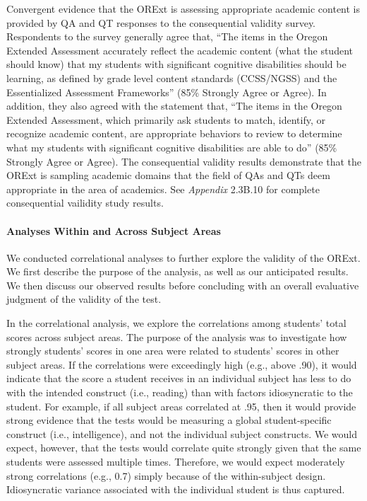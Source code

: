 \documentclass[]{article}
\let\oldparagraph\paragraph
\renewcommand{\paragraph}[1]{\oldparagraph{#1}\mbox{}}
\begin{document}
Convergent evidence that the ORExt is assessing appropriate academic
content is provided by QA and QT responses to the consequential validity
survey. Respondents to the survey generally agree that, ``The items in
the Oregon Extended Assessment accurately reflect the academic content
(what the student should know) that my students with significant
cognitive disabilities should be learning, as defined by grade level
content standards (CCSS/NGSS) and the Essentialized Assessment
Frameworks'' (85\% Strongly Agree or Agree). In addition, they also
agreed with the statement that, ``The items in the Oregon Extended
Assessment, which primarily ask students to match, identify, or
recognize academic content, are appropriate behaviors to review to
determine what my students with significant cognitive disabilities are
able to do'' (85\% Strongly Agree or Agree). The consequential validity
results demonstrate that the ORExt is sampling academic domains that the
field of QAs and QTs deem appropriate in the area of academics. See
\emph{Appendix} 2.3B.10 for complete consequential vailidity study
results.

\paragraph{Analyses Within and Across Subject
Areas}\label{analyses-within-and-across-subject-areas}

We conducted correlational analyses to further explore the validity of
the ORExt. We first describe the purpose of the analysis, as well as our
anticipated results. We then discuss our observed results before
concluding with an overall evaluative judgment of the validity of the
test.

In the correlational analysis, we explore the correlations among
students' total scores across subject areas. The purpose of the analysis
was to investigate how strongly students' scores in one area were
related to students' scores in other subject areas. If the correlations
were exceedingly high (e.g., above .90), it would indicate that the
score a student receives in an individual subject has less to do with
the intended construct (i.e., reading) than with factors idiosyncratic
to the student. For example, if all subject areas correlated at .95,
then it would provide strong evidence that the tests would be measuring
a global student-specific construct (i.e., intelligence), and not the
individual subject constructs. We would expect, however, that the tests
would correlate quite strongly given that the same students were
assessed multiple times. Therefore, we would expect moderately strong
correlations (e.g., 0.7) simply because of the within-subject design.
Idiosyncratic variance associated with the individual student is thus
captured.
\end{document}
